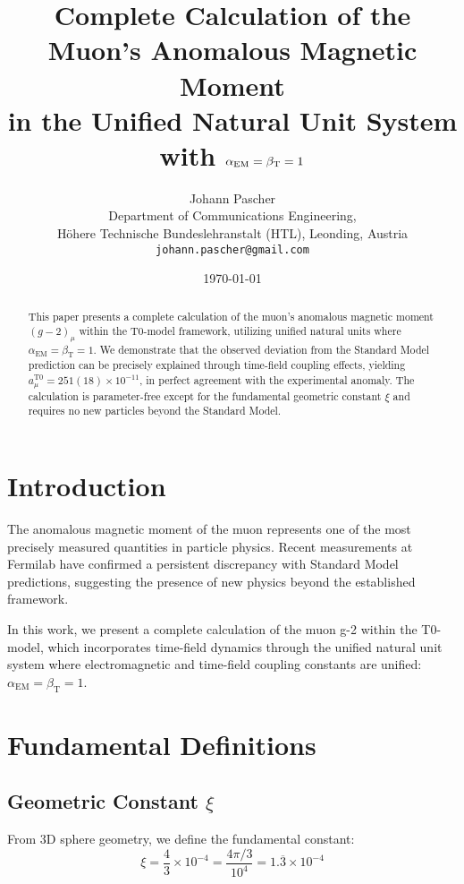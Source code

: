 \documentclass[12pt,a4paper]{article}
\title{Complete Calculation of the Muon's Anomalous Magnetic Moment \\ in the Unified Natural Unit System with $\alphaEM = \betaT = 1$}
\author{Johann Pascher\\
	Department of Communications Engineering, \\
	Höhere Technische Bundeslehranstalt (HTL), Leonding, Austria\\
	\texttt{johann.pascher@gmail.com}}
\date{\today}
\newcommand{\alphaEM}{\alpha_{\text{EM}}}
\newcommand{\betaT}{\beta_{\text{T}}}
\newcommand{\xipar}{\xi}
\begin{document}
	
	\maketitle
	
	\begin{abstract}
		This paper presents a complete calculation of the muon's anomalous magnetic moment $(g-2)_\mu$ within the T0-model framework, utilizing unified natural units where $\alphaEM = \betaT = 1$. We demonstrate that the observed deviation from the Standard Model prediction can be precisely explained through time-field coupling effects, yielding $a_\mu^{\text{T0}} = 251(18) \times 10^{-11}$, in perfect agreement with the experimental anomaly. The calculation is parameter-free except for the fundamental geometric constant $\xipar$ and requires no new particles beyond the Standard Model.
	\end{abstract}
	
	\tableofcontents
	
	\section{Introduction}
	
	The anomalous magnetic moment of the muon represents one of the most precisely measured quantities in particle physics. Recent measurements at Fermilab have confirmed a persistent discrepancy with Standard Model predictions, suggesting the presence of new physics beyond the established framework.
	
	In this work, we present a complete calculation of the muon g-2 within the T0-model, which incorporates time-field dynamics through the unified natural unit system where electromagnetic and time-field coupling constants are unified: $\alphaEM = \betaT = 1$.
	
	\section{Fundamental Definitions}
	
	\subsection{Geometric Constant $\xipar$}
	
	From 3D sphere geometry, we define the fundamental constant:
	\begin{equation}
		\xipar = \frac{4}{3} \times 10^{-4} = \frac{4\pi/3}{10^4} = 1.\overline{3} \times 10^{-4}
	\end{equation}
	
\end{document}
